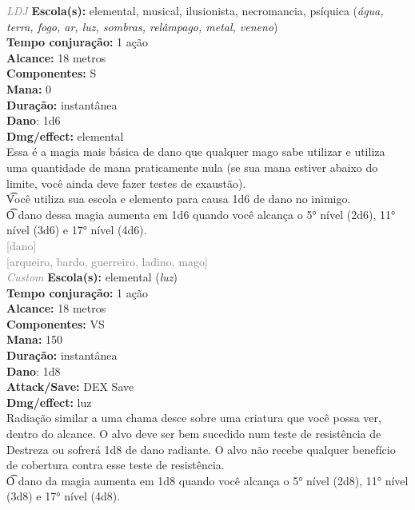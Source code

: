 \documentclass{RPG_Adventure}[2021/10/20]
\begin{document}
{\tiny \textcolor{gray}{\textit{LDJ}}}
{\small \t \textbf{Escola(s):} elemental, musical, ilusionista, necromancia, psíquica (\textit{água, terra, fogo, ar, luz, sombras, relâmpago, metal, veneno})\\\t \textbf{Tempo conjuração:} 1 ação\\\t \textbf{Alcance:} 18 metros\\\t \textbf{Componentes:} S\\\t \textbf{Mana:} 0\\\t \textbf{Duração:} instantânea\\\t \textbf{Dano}: 1d6\\\t \textbf{Dmg/effect:} elemental\\}
{\normalsize Essa é a magia mais básica de dano que qualquer mago sabe utilizar e utiliza uma quantidade de mana praticamente nula (se sua mana estiver abaixo do limite, você ainda deve fazer testes de exaustão).\\\t Você utiliza sua escola e elemento para causa 1d6 de dano no inimigo.\\\t O dano dessa magia aumenta em 1d6 quando você alcança o 5° nível (2d6), 11° nível (3d6) e 17° nível (4d6).\\}
{\scriptsize \textcolor{gray}{[dano]\\}}
{\scriptsize \textcolor{gray}{[arqueiro, bardo, guerreiro, ladino, mago]\\}}
{\tiny \textcolor{gray}{\textit{Custom}}}
{\small \t \textbf{Escola(s):} elemental (\textit{luz})\\\t \textbf{Tempo conjuração:} 1 ação\\\t \textbf{Alcance:} 18 metros\\\t \textbf{Componentes:} VS\\\t \textbf{Mana:} 150\\\t \textbf{Duração:} instantânea\\\t \textbf{Dano}: 1d8\\\t \textbf{Attack/Save:} DEX Save\\\t \textbf{Dmg/effect:} luz\\}
{\normalsize Radiação similar a uma chama desce sobre uma criatura que você possa ver, dentro do alcance. O alvo deve ser bem sucedido num teste de resistência de Destreza ou sofrerá 1d8 de dano radiante. O alvo não recebe qualquer benefício de cobertura contra esse teste de resistência.\\\t O dano da magia aumenta em 1d8 quando você alcança o 5° nível (2d8), 11° nível (3d8) e 17° nível (4d8).\\}
\end{document}
